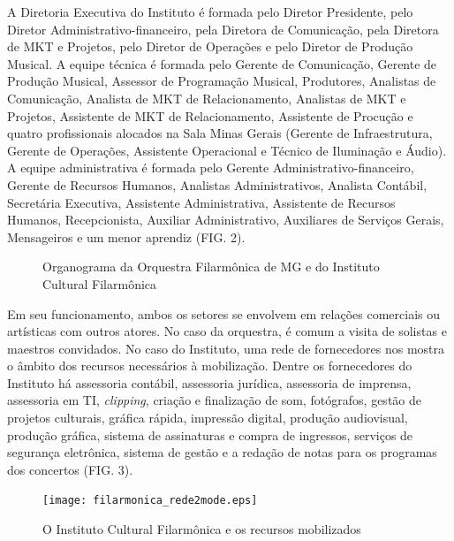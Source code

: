 \documentclass[a4paper, 12pt, openright, oneside, german, french, english, brazil]{abntex2}
\begin{document}
	A Diretoria Executiva do Instituto é formada pelo Diretor Presidente, pelo Diretor Administrativo-financeiro, pela Diretora de Comunicação, pela Diretora de MKT e Projetos, pelo Diretor de Operações e pelo Diretor de Produção Musical. A equipe técnica é formada pelo Gerente de Comunicação, Gerente de Produção Musical, Assessor de Programação Musical, Produtores, Analistas de Comunicação, Analista de MKT de Relacionamento, Analistas de MKT e Projetos, Assistente de MKT de Relacionamento, Assistente de Procução e quatro profissionais alocados na Sala Minas Gerais (Gerente de Infraestrutura, Gerente de Operações, Assistente Operacional e Técnico de Iluminação e Áudio). A equipe administrativa é formada pelo Gerente Administrativo-financeiro, Gerente de Recursos Humanos, Analistas Administrativos, Analista Contábil, Secretária Executiva, Assistente Administrativa, Assistente de Recursos Humanos, Recepcionista, Auxiliar Administrativo, Auxiliares de Serviços Gerais, Mensageiros e um menor aprendiz (FIG. 2).
	
	\begin{figure}[h]
		\centering
		\caption{Organograma da Orquestra Filarmônica de MG e do Instituto Cultural Filarmônica}
	\end{figure}
	
	Em seu funcionamento, ambos os setores se envolvem em relações comerciais ou artísticas com outros atores. No caso da orquestra, é comum a visita de solistas e maestros convidados. No caso do Instituto, uma rede de fornecedores nos mostra o âmbito dos recursos necessários à mobilização. Dentre os fornecedores do Instituto há assessoria contábil, assessoria jurídica, assessoria de imprensa, assessoria em TI, \textit{clipping}, criação e finalização de som, fotógrafos, gestão de projetos culturais, gráfica rápida, impressão digital, produção audiovisual, produção gráfica, sistema de assinaturas e compra de ingressos, serviços de segurança eletrônica, sistema de gestão e a redação de notas para os programas dos concertos (FIG. 3). 
	
	\begin{figure}
		\centering
		\caption{O Instituto Cultural Filarmônica e os recursos mobilizados}
		\texttt{[image: filarmonica\_rede2mode.eps]}
		\label{fil2mode}
	\end{figure}
	
\end{document}
